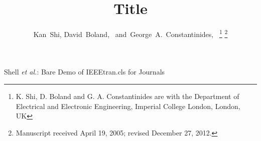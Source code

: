\documentclass[journal]{IEEEtran}
\begin{document}
\title{Title}
%
%
%

\author{Kan~Shi,
        David~Boland,~
        and~George~A.~Constantinides,~%
	\thanks{K. Shi, D. Boland and G. A. Constantinides are with the Department of Electrical and Electronic Engineering, Imperial College London, London, UK}%
\thanks{Manuscript received April 19, 2005; revised December 27, 2012.}}

% 
%



%
{Shell \MakeLowercase{\textit{et al.}}: Bare Demo of IEEEtran.cls for Journals}

\maketitle
\end{document}
